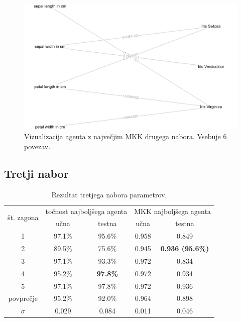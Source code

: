 \begin{figure}[H]
    \begin{center}
        \includegraphics[width=13cm]{iris/2/mcc_g}
    \end{center}
    \caption{Vizualizacija agenta z največjim MKK drugega nabora. Vsebuje 6 povezav.}
    \label{fig:iris_mcc_2_g}
\end{figure}

\subsection{Tretji nabor}\label{subsec:dodatek-iris-tretji-nabor}
\begin{table}[H]
    \begin{center}
        \begin{tabular}{|| c | c c || c c ||}
            \hline
            \multirow{2}{*}{št. zagona} & \multicolumn{2}{c||}{točnost najboljšega agenta} & \multicolumn{2}{c||}{MKK najboljšega agenta} \\ \cline{2-5}
            & učna   & testna          & učna  & testna                  \\
            \hline
            1         & 97.1\% & 95.6\%          & 0.958 & 0.849                   \\
            \hline
            2         & 89.5\% & 75.6\%          & 0.945 & \textbf{0.936 (95.6\%)} \\
            \hline
            3         & 97.1\% & 93.3\%          & 0.972 & 0.834                   \\
            \hline
            4         & 95.2\% & \textbf{97.8\%} & 0.972 & 0.934                   \\
            \hline
            5         & 97.1\% & 97.8\%          & 0.972 & 0.936                   \\
            \hline
            povprečje & 95.2\% & 92.0\%          & 0.964 & 0.898                   \\
            \hline
            $\sigma$  & 0.029  & 0.084           & 0.011 & 0.046                   \\
            \hline
        \end{tabular}
    \end{center}
    \caption{Rezultat tretjega nabora parametrov.}
    \label{tab:iris_result_3}
\end{table}

